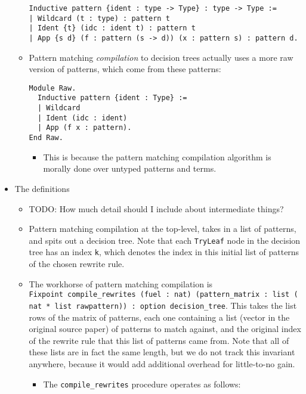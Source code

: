 \begin{itemize}
\begin{itemize}
\begin{verbatim}
Inductive pattern {ident : type -> Type} : type -> Type :=
| Wildcard (t : type) : pattern t
| Ident {t} (idc : ident t) : pattern t
| App {s d} (f : pattern (s -> d)) (x : pattern s) : pattern d.
\end{verbatim}
  \item
    Pattern matching \emph{compilation} to decision trees actually uses
    a more raw version of patterns, which come from these patterns:

\begin{verbatim}
Module Raw.
  Inductive pattern {ident : Type} :=
  | Wildcard
  | Ident (idc : ident)
  | App (f x : pattern).
End Raw.
\end{verbatim}

    \begin{itemize}
    \tightlist
    \item
      This is because the pattern matching compilation algorithm is
      morally done over untyped patterns and terms.
    \end{itemize}
  \end{itemize}
\item
  The definitions

  \begin{itemize}
  \tightlist
  \item
    TODO: How much detail should I include about intermediate things?
  \item
    Pattern matching compilation at the top-level, takes in a list of
    patterns, and spits out a decision tree. Note that each
    \texttt{TryLeaf} node in the decision tree has an index \texttt{k},
    which denotes the index in this initial list of patterns of the
    chosen rewrite rule.
  \item
    The workhorse of pattern matching compilation is
    \texttt{Fixpoint\ compile\_rewrites\textquotesingle{}\ (fuel\ :\ nat)\ (pattern\_matrix\ :\ list\ (nat\ *\ list\ rawpattern))\ :\ option\ decision\_tree}.
    This takes the list rows of the matrix of patterns, each one
    containing a list (vector in the original source paper) of patterns
    to match against, and the original index of the rewrite rule that
    this list of patterns came from. Note that all of these lists are in
    fact the same length, but we do not track this invariant anywhere,
    because it would add additional overhead for little-to-no gain.

    \begin{itemize}
    \tightlist
    \item
      The \texttt{compile\_rewrites\textquotesingle{}} procedure
      operates as follows:


\end{itemize}
\end{itemize}
\end{itemize}
